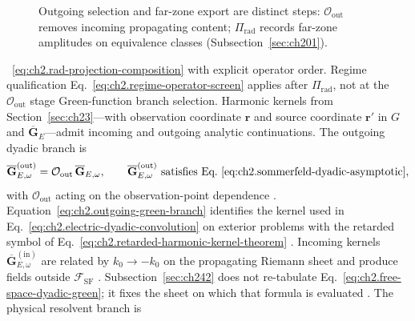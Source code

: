 \begin{figure}[t]
\centering
{}
\caption{Outgoing selection and far-zone export are distinct steps:
$\mathcal{O}_{\mathrm{out}}$ removes incoming propagating content;
$\Pi_{\mathrm{rad}}$ records far-zone amplitudes on equivalence classes
(Subsection~\ref{sec:ch201}).}
\label{fig:ch2.outgoing-selector-measurement chain}
\end{figure}
~\eqref{eq:ch2.rad-projection-composition} with explicit operator order. Regime
qualification Eq.~\eqref{eq:ch2.regime-operator-screen} applies after
\(\Pi_{\mathrm{rad}}\), not at the \(\mathcal{O}_{\mathrm{out}}\) stage
Green-function branch selection. Harmonic kernels from Section~\ref{sec:ch23}---with observation coordinate $\mathbf{r}$ and
source coordinate $\mathbf{r}'$ in $G$ and $\overline{\mathbf{G}}_{E}$---admit incoming and
outgoing analytic continuations. The outgoing dyadic branch is
\begin{equation}
\label{eq:ch2.outgoing-green-branch}
\overline{\mathbf{G}}_{E,\omega}^{\mathrm{(out)}}
=
\mathcal{O}_{\mathrm{out}}\,\overline{\mathbf{G}}_{E,\omega},
\qquad
\overline{\mathbf{G}}_{E,\omega}^{\mathrm{(out)}}
\ \text{satisfies}\ 
\text{Eq.~\eqref{eq:ch2.sommerfeld-dyadic-asymptotic}},
\end{equation}
with \(\mathcal{O}_{\mathrm{out}}\) acting on the observation-point dependence
\cite{stratton1941}. Equation~\eqref{eq:ch2.outgoing-green-branch}
identifies the kernel used in Eq.~\eqref{eq:ch2.electric-dyadic-convolution} on
exterior problems with the retarded symbol of
Eq.~\eqref{eq:ch2.retarded-harmonic-kernel-theorem} \cite{stratton1941}. Incoming
kernels \(\overline{\mathbf{G}}_{E,\omega}^{\mathrm{(in)}}\) are related by
\(k_0\to -k_0\) on the propagating Riemann sheet and produce fields outside
\(\mathcal{F}_{\mathrm{SF}}\) \cite{jackson1999}. Subsection~\ref{sec:ch242} does
not re-tabulate Eq.~\eqref{eq:ch2.free-space-dyadic-green}; it fixes the sheet on
which that formula is evaluated \cite{harrington2001}. The physical resolvent branch is
